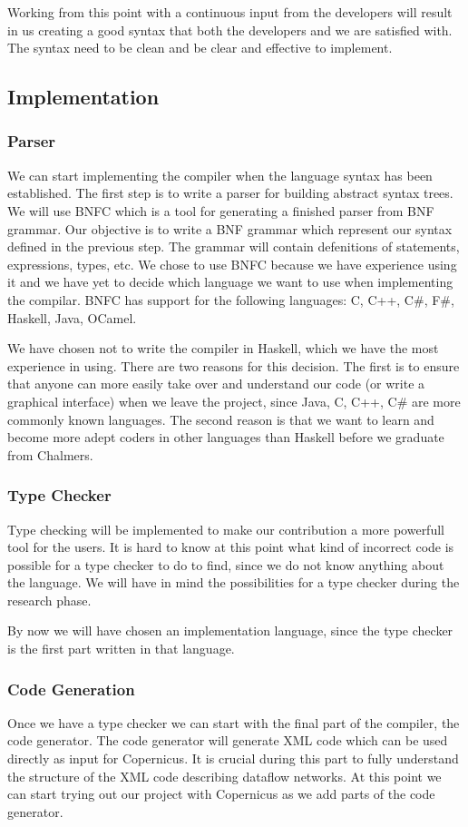 \documentclass[a4paper]{article}
\begin{document}
Working from this point with a continuous input from the developers
will result in us creating a good syntax that both the developers and
we are satisfied with. The syntax need to be clean and be clear and
effective to implement.

\subsection{Implementation}
\subsubsection{Parser}
We can start implementing the compiler when the language syntax has
been established. The first step is to write a parser for building
abstract syntax trees. We will use BNFC which is a tool for generating
a finished parser from BNF grammar. Our objective is to write a BNF
grammar which represent our syntax defined in the previous step. The
grammar will contain defenitions of statements, expressions, types,
etc. We chose to use BNFC because we have experience using it and we
have yet to decide which language we want to use when implementing the
compilar. BNFC has support for the following languages: C, C++, C\#,
F\#, Haskell, Java, OCamel.

We have chosen not to write the compiler in Haskell, which we have the
most experience in using. There are two reasons for this decision. The
first is to ensure that anyone can more easily take over and
understand our code (or write a graphical interface) when we leave the
project, since Java, C, C++, C\# are more commonly known languages. The
second reason is that we want to learn and become more adept coders in
other languages than Haskell before we graduate from Chalmers.

\subsubsection{Type Checker}
Type checking will be implemented to make our contribution a more
powerfull tool for the users. It is hard to know at this point what
kind of incorrect code is possible for a type checker to do to find,
since we do not know anything about the language. We will have in mind
the possibilities for a type checker during the research phase.

By now we will have chosen an implementation language, since the type
checker is the first part written in that language.

\subsubsection{Code Generation}
Once we have a type checker we can start with the final part of the
compiler, the code generator. The code generator will generate XML
code which can be used directly as input for Copernicus. It is crucial
during this part to fully understand the structure of the XML code
describing dataflow networks. At this point we can start trying out
our project with Copernicus as we add parts of the code generator.
\end{document}
